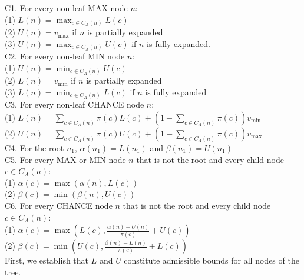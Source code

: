 \documentclass[letterpaper]{article} %
\newcommand{\pess}{\mathit{L}}
\newcommand{\opti}{\mathit{U}}
\newcommand{\vmax}{v_{\text{max}}}
\newcommand{\vmin}{v_{\text{min}}}
\newcommand{\rootnode}{\mathit{n_1}}
\begin{document}
\noindent C1. For every non-leaf MAX node $n$:\\ 
 \indent (1) $\pess(n)=\max_{c\in C_A(n)} \pess(c)$\\
 \indent (2) $\opti(n)=\vmax$ if $n$ is partially expanded \\
 \indent (3) $\opti(n)=\max_{c\in C_A(n)} \opti(c)$ if $n$ is fully expanded.\\[2mm]
\noindent C2. For every non-leaf MIN node $n$:\\
\indent (1) $\opti(n)=\min_{c\in C_A(n)} \opti(c)$ \\
\indent (2) $\pess(n)=\vmin$ if $n$ is partially expanded \\
\indent (3) $\pess(n)=\min_{c\in C_A(n)} \pess(c)$ if $n$ is fully expanded\\[2mm]
\noindent C3. For every non-leaf CHANCE node $n$:\\ 
\indent (1) $\pess(n)= \sum\limits_{c\in C_A(n)} \pi(c) \pess(c) + (1-\sum\limits_{c\in C_A(n)} \pi(c)) \vmin{}$ \\
\indent (2) $\opti(n)= \sum\limits_{c\in C_A(n)} \pi(c) \opti(c) + (1-\sum\limits_{c\in C_A(n)} \pi(c)) \vmax{}$ \\[2mm]
\noindent C4. For the root $n_1$, $\alpha(\rootnode)=\pess(\rootnode)$ and $\beta(\rootnode)=\opti(\rootnode)$\\[2mm]
\noindent C5. For every MAX or MIN node $n$ that is not the root and every child node $c\in C_A(n)$:\\
\indent (1) $\alpha(c)=\max(\alpha(n),\pess(c))$\\
\indent (2) $\beta(c)=\min(\beta(n),\opti(c))$ \\[2mm]
\noindent C6. For every CHANCE node $n$  that is not the root and every child node $c \in C_A(n)$:\\
\indent (1) $\alpha(c) = \max(\pess(c), \frac{\alpha(n)-\opti(n)}{\pi(c)}+\opti(c))$ \\
\indent (2) $\beta(c) = \min(\opti(c), \frac{\beta(n)-\pess(n)}{\pi(c)}+\pess(c))$\\


First, we establish that $\pess$ and $\opti$ constitute admissible bounds for all nodes of the tree.
\end{document}
